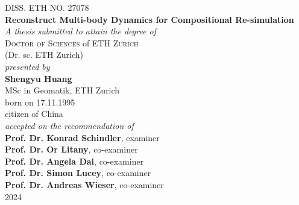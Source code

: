
\begin{center}
	\large{DISS. ETH NO. 27078}\\
\vspace{2 cm}
	\Large{\textbf{Reconstruct Multi-body Dynamics for Compositional Re-simulation}}\\
\vspace{2 cm}
	\large{\emph{A thesis submitted to attain the degree of}}\\
\vspace{0.5cm}
	\large{\textsc{Doctor of Sciences} of \textsc{ETH Zurich}}\\
\vspace{0.5cm}
	\large{(Dr. sc. ETH Zurich)}\\
\vspace{2cm}
	\large{\emph{presented by}}\\
\vspace{0.5cm}
	\large{\textbf{Shengyu Huang}}\\
\vspace{0.3cm}
	\large{MSc in Geomatik, ETH Zurich}\\
\vspace{0.3cm}
	\large{born on 17.11.1995}\\
\vspace{0.3cm}
	\large{citizen of China}\\
\vspace{2cm}
	\large{\emph{accepted on the recommendation of}}\\
\vspace{0.5cm}
	\large{\textbf{Prof. Dr. Konrad Schindler}, examiner %
}\\
\vspace{0.1cm}
	\large{\textbf{Prof. Dr. Or Litany}, co-examiner %
}\\
\vspace{0.1cm}
	\large{\textbf{Prof. Dr. Angela Dai}, co-examiner %
}\\
\vspace{0.1cm}
	\large{\textbf{Prof. Dr. Simon Lucey}, co-examiner %
}\\
\vspace{0.1cm}
	\large{\textbf{Prof. Dr. Andreas Wieser}, co-examiner %
}\\

\vspace{2cm}
	\large{2024}
\end{center}


